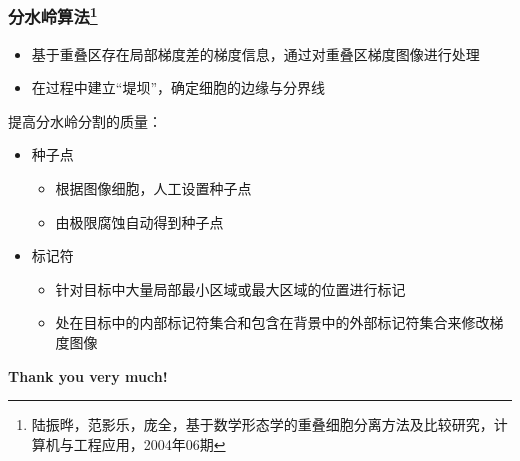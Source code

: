 \documentclass[notheorems,mathserif,table,compress]{beamer}  %
\begin{document}
\begin{frame}
  \frametitle{分水岭算法\footnote{陆振晔，范影乐，庞全，基于数学形态学的重叠细胞分离方法及比较研究，计算机与工程应用，2004年06期}}
  \begin{itemize}
  \item 基于重叠区存在局部梯度差的梯度信息，通过对重叠区梯度图像进行处理
  \item 在过程中建立“堤坝”，确定细胞的边缘与分界线\newline
  \end{itemize}
  提高分水岭分割的质量：
  \begin{itemize}
  \item 种子点
  	\begin{itemize}
  	\item 根据图像细胞，人工设置种子点
  	\item 由极限腐蚀自动得到种子点
  	\end{itemize}
  \item 标记符
  	\begin{itemize}
  	\item 针对目标中大量局部最小区域或最大区域的位置进行标记
  	\item 处在目标中的内部标记符集合和包含在背景中的外部标记符集合来修改梯度图像
  	\end{itemize}
  \end{itemize}
\end{frame}


\begin{frame}
   \begin{Huge}
   \textbf{Thank you very much!}
   \end{Huge}
\end{frame}
\end{document}
